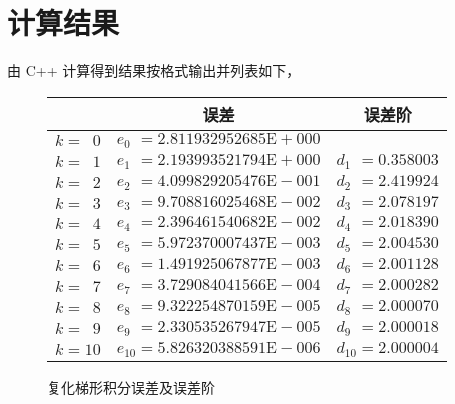 \documentclass[11pt]{article}
\begin{document}
\section{计算结果}
由 C++ 计算得到结果按格式输出并列表如下，
\begin{figure}[h]
    \centering
    \begin{tabular}{|l|c|c|}
        \hline
                           & 误差                                              & 误差阶                        \\ \hline
        $k = \phantom{1}0$ & $e_{0\phantom{1}} = 2.811932952685\text{E}{+}000$ &                               \\\hline
        $k = \phantom{1}1$ & $e_{1\phantom{1}} = 2.193993521794\text{E}{+}000$ & $d_{1\phantom{1}} = 0.358003$ \\   \hline
        $k = \phantom{1}2$ & $e_{2\phantom{1}} = 4.099829205476\text{E}{-}001$ & $d_{2\phantom{1}} = 2.419924$ \\   \hline
        $k = \phantom{1}3$ & $e_{3\phantom{1}} = 9.708816025468\text{E}{-}002$ & $d_{3\phantom{1}} = 2.078197$ \\   \hline
        $k = \phantom{1}4$ & $e_{4\phantom{1}} = 2.396461540682\text{E}{-}002$ & $d_{4\phantom{1}} = 2.018390$ \\   \hline
        $k = \phantom{1}5$ & $e_{5\phantom{1}} = 5.972370007437\text{E}{-}003$ & $d_{5\phantom{1}} = 2.004530$ \\   \hline
        $k = \phantom{1}6$ & $e_{6\phantom{1}} = 1.491925067877\text{E}{-}003$ & $d_{6\phantom{1}} = 2.001128$ \\   \hline
        $k = \phantom{1}7$ & $e_{7\phantom{1}} = 3.729084041566\text{E}{-}004$ & $d_{7\phantom{1}} = 2.000282$ \\   \hline
        $k = \phantom{1}8$ & $e_{8\phantom{1}} = 9.322254870159\text{E}{-}005$ & $d_{8\phantom{1}} = 2.000070$ \\   \hline
        $k = \phantom{1}9$ & $e_{9\phantom{1}} = 2.330535267947\text{E}{-}005$ & $d_{9\phantom{1}} = 2.000018$ \\   \hline
        $k = 10$           & $e_{10} = 5.826320388591\text{E}{-}006$           & $d_{10} = 2.000004$           \\ \hline
    \end{tabular}
    \caption{复化梯形积分误差及误差阶}
    \label{table:Trapezoid}
\end{figure}
\end{document}
